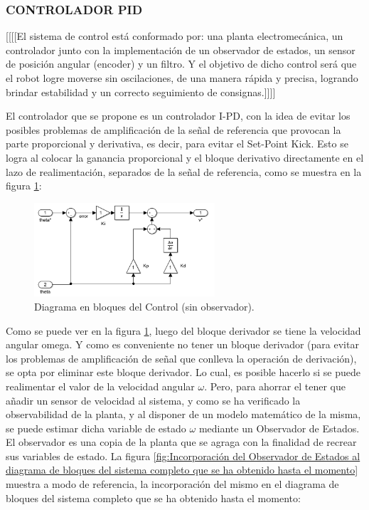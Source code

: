\documentclass{article}
\begin{document}
\begin{sloppypar}
\subsubsection{CONTROLADOR PID}
\label{sec:CONTROLADOR PID}

[[[[El sistema de control está conformado por: una planta electromecánica, un controlador junto con la implementación de un observador de estados, un sensor de posición angular (encoder) y un filtro. Y el objetivo de dicho control será que el robot logre moverse sin oscilaciones, de una manera rápida y precisa, logrando brindar estabilidad y un correcto seguimiento de consignas.]]]]

El controlador que se propone es un controlador I-PD, con la idea de evitar los posibles problemas de amplificación de la señal de referencia que provocan la parte proporcional y derivativa, es decir, para evitar el Set-Point Kick. Esto se logra al colocar la ganancia proporcional y el bloque derivativo directamente en el lazo de realimentación, separados de la señal de referencia, como se muestra en la figura \ref{fig:Diagrama en bloques del Control (sin observador)}:

\begin{figure}[H]
    \centering
    \includegraphics[width=0.60\textwidth]{Diagrama en bloques del Control (sin observador)}
    \caption{Diagrama en bloques del Control (sin observador).}
    \label{fig:Diagrama en bloques del Control (sin observador)}
\end{figure}

Como se puede ver en la figura \ref{fig:Diagrama en bloques del Control (sin observador)}, luego del bloque derivador se tiene la velocidad angular omega. Y como es conveniente no tener un bloque derivador (para evitar los problemas de amplificación de señal que conlleva la operación de derivación), se opta por eliminar este bloque derivador. Lo cual, es posible hacerlo si se puede realimentar el valor de la velocidad angular $\omega$. Pero, para ahorrar el tener que añadir un sensor de velocidad al sistema, y como se ha verificado la observabilidad de la planta, y al disponer de un modelo matemático de la misma, se puede estimar dicha variable de estado $\omega$ mediante un Observador de Estados. El observador es una copia de la planta que se agraga con la finalidad de recrear sus variables de estado. La figura \ref{fig:Incorporación del Observador de Estados al diagrama de bloques del sistema completo que se ha obtenido hasta el momento} muestra a modo de referencia, la incorporación del mismo en el diagrama de bloques del sistema completo que se ha obtenido hasta el momento:


\end{sloppypar}
\end{document}
